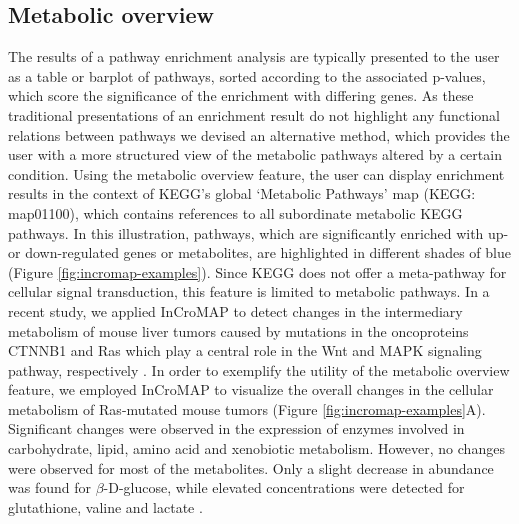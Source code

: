 \documentclass[final,5p,times,twocolumn]{elsarticle}
\newcommand\red[1]{{\color{red}#1}}
\begin{document}
\subsection{Metabolic overview}
The results of a pathway enrichment analysis are typically presented to the user as a table or barplot of pathways, sorted according to the associated p-values, which score the significance of the enrichment with differing genes. As these traditional presentations of an enrichment result do not highlight any functional relations between pathways we devised an alternative method, which provides the user with a more structured view of the metabolic pathways altered by a certain condition. Using the metabolic overview feature, the user can display enrichment results in the context of KEGG's global `Metabolic Pathways' map (KEGG: map01100), which contains references to all subordinate metabolic KEGG pathways. In this illustration, pathways, which are significantly enriched with up- or down-regulated genes or metabolites, are highlighted in different shades of blue (Figure \ref{fig:incromap-examples}). Since KEGG does not offer a meta-pathway for cellular signal transduction, this feature is limited to metabolic pathways. \red{In a recent study, we applied InCroMAP to detect changes in the intermediary metabolism of mouse liver tumors caused by mutations in the oncoproteins CTNNB1 and Ras which play a central role in the Wnt and MAPK signaling pathway, respectively \cite{Unterberger2014}. In order to exemplify the utility of the metabolic overview feature, we employed InCroMAP to visualize the overall changes in the cellular metabolism of Ras-mutated mouse tumors (Figure \ref{fig:incromap-examples}A). Significant changes were observed in the expression of enzymes involved in carbohydrate, lipid, amino acid and xenobiotic metabolism. However, no changes were observed for most of the metabolites. Only a slight decrease in abundance was found for $\beta$-D-glucose, while elevated concentrations were detected for glutathione, valine and lactate \cite{Unterberger2014}.}
\end{document}
